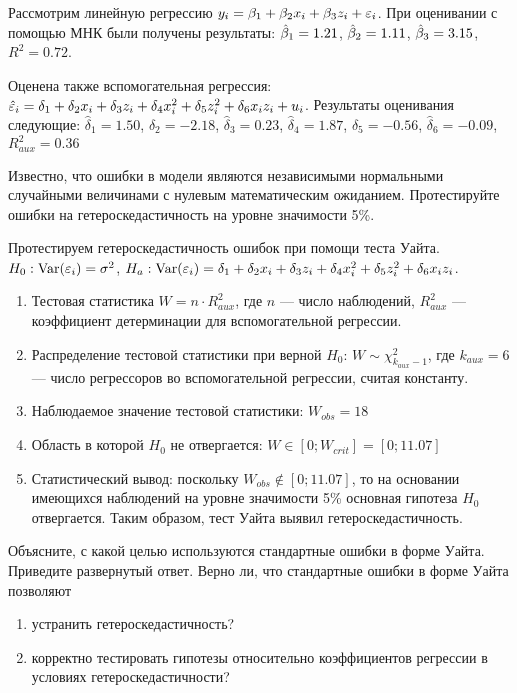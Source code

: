 \documentclass[pdftex,11pt,openany]{book}\usepackage[]{graphicx}\usepackage[]{color}
\begin{document}
\begin{problem}
Рассмотрим линейную регрессию $y_i = \beta_1 + \beta_2 x_i + \beta_3 z_i + \varepsilon_i$. При оценивании с помощью МНК были получены результаты: $\hat{\beta}_1=1.21$, $\hat{\beta}_2=1.11$, $\hat{\beta}_3=3.15$, $R^2=0.72$.

Оценена также вспомогательная регрессия: $\hat{\varepsilon}_i=\delta_1+\delta_2 x_i +\delta_3 z_i+\delta_4 x_i^2+\delta_5 z_i^2+\delta_6 x_i z_i + u_i$. Результаты оценивания следующие: $\hat{\delta}_1=1.50$, $\hat{\delta}_2=-2.18$,  $\hat{\delta}_3=0.23$,  $\hat{\delta}_4=1.87$,  $\hat{\delta}_5=-0.56$,  $\hat{\delta}_6=-0.09$,  $R^2_{aux}=0.36$ 


Известно, что ошибки в модели являются независимыми нормальными случайными величинами с нулевым математическим ожиданием. Протестируйте
ошибки на гетероскедастичность на уровне значимости 5\%.
\end{problem}

\begin{solution}
Протестируем гетероскедастичность ошибок при помощи теста Уайта. $H_0: \operatorname{Var}(\varepsilon_i)=\sigma^2$, $H_a: \operatorname{Var}(\varepsilon_i)=\delta_1+\delta_2 x_i +\delta_3 z_i+\delta_4 x_i^2+\delta_5 z_i^2+\delta_6 x_i z_i$.
\begin{enumerate}
\item Тестовая статистика $W=n\cdot R^2_{aux}$, где $n$ --- число наблюдений, $R^2_{aux}$ --- коэффициент детерминации для вспомогательной регрессии.
\item Распределение тестовой статистики при верной $H_0$: $W\sim \chi^2_{k_{aux}-1}$, где $k_{aux}=6$ --- число регрессоров во вспомогательной регрессии, считая константу.
\item Наблюдаемое значение тестовой статистики: $W_{obs}=18$
\item Область в которой $H_0$ не отвергается: $W\in [0;W_{crit}]=[0;11.07]$
\item Статистический вывод: поскольку $W_{obs} \notin [0;11.07]$, то на основании имеющихся наблюдений на уровне значимости 5\% основная гипотеза $H_0$ отвергается. Таким образом, тест Уайта выявил гетероскедастичность.
\end{enumerate}
\end{solution}



\begin{problem}
Объясните, с какой целью используются стандартные ошибки в форме Уайта. Приведите развернутый ответ. Верно ли, что стандартные ошибки в форме Уайта позволяют
\begin{enumerate}
\item устранить гетероскедастичность?
\item корректно тестировать гипотезы относительно коэффициентов регрессии в условиях гетероскедастичности? 
\end{enumerate}
\end{problem}
\end{document}
